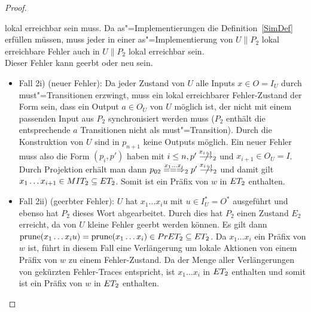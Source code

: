 \begin{proof}
\begin{itemize}
      lokal erreichbar sein muss. Da as"=Implementierungen die
      Definition~\ref{SimDef} erfüllen müssen, muss jeder in einer
      as"=Implementierung von $U\|P_2$ lokal erreichbare Fehler auch in
      $U\|P_2$ lokal erreichbar sein.\\
      Dieser Fehler kann geerbt oder neu sein.
      \begin{itemize}
        \item Fall 2i) (neuer Fehler): Da jeder Zustand von $U$ alle Inputs
          $x\in O=I_U$ durch must"=Transitionen erzwingt, muss ein lokal
          erreichbarer Fehler-Zustand der Form sein, dass ein Output $a\in O_U$
          von $U$ möglich ist, der nicht mit einem passenden Input aus $P_2$
          synchronisiert werden muss ($P_2$ enthält die entsprechende $a$
          Transitionen nicht als must"=Transition). Durch die Konstruktion von
          $U$ sind in $p_{n+1}$ keine Outputs möglich. Ein neuer
          Fehler muss also die Form $(p_i,p')$ haben mit $i\leq
          n, p'\nmust[x_{i+1}]_2$ und $x_{i+1}\in O_U=I$. Durch Projektion
          erhält man dann $p_{02}\lweakmay[x_1\dots x_i]_2p'\nmust[x_{i+1}]_2$
          und damit gilt $x_1\dots x_{i+1}\in MIT _2\subseteq ET _2$. Somit
          ist ein Präfix von $w$ in $ET _2$ enthalten.
        \item Fall 2ii) (geerbter Fehler): $U$ hat $x_1\dots x_iu$ mit $u\in
          I_U^*=O^*$ ausgeführt und ebenso hat $P_2$ dieses Wort abgearbeitet.
          Durch dies hat $P_2$ einen Zustand $E_2$ erreicht, da von $U$ kleine
          Fehler geerbt werden können. Es gilt dann $\mathrm{prune} (x_1\dots x_iu) =
          \mathrm{prune} (x_1\dots x_i)\in PrET _2\subseteq ET _2$. Da $x_1\dots x_i$
          ein Präfix von $w$ ist, führt in diesem Fall eine Verlängerung um
          lokale Aktionen von einem Präfix von $w$ zu einem Fehler-Zustand. Da
          \ET{} der Menge aller Verlängerungen von gekürzten
          Fehler-Traces entspricht, ist $x_1\dots x_i$ in $ET
          _2$ enthalten und somit ist ein Präfix von $w$ in $ET _2$ enthalten.
      \end{itemize}
  \end{itemize}


\end{proof}
